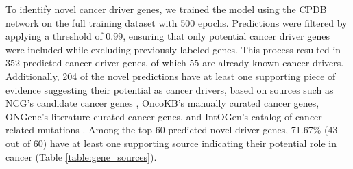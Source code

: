To identify novel cancer driver genes, we trained the model using the CPDB network on the full training dataset with 500 epochs. Predictions were filtered by applying a threshold of 0.99, ensuring that only potential cancer driver genes were included while excluding previously labeled genes. This process resulted in 352 predicted cancer driver genes, of which 55 are already known cancer drivers. Additionally, 204 of the novel predictions have at least one supporting piece of evidence suggesting their potential as cancer drivers, based on sources such as NCG’s candidate cancer genes \cite{Repana2019}, OncoKB’s manually curated cancer genes, ONGene’s literature-curated cancer genes, and IntOGen's catalog of cancer-related mutations \cite{martinez2020compendium}. Among the top 60 predicted novel driver genes, 71.67\% (43 out of 60) have at least one supporting source indicating their potential role in cancer (Table \ref{table:gene_sources}).
 
